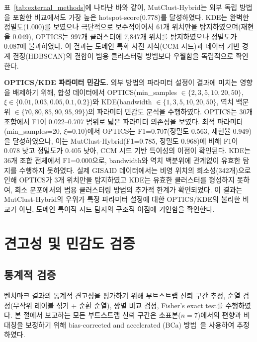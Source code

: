 표~\ref{tab:external_methods}에 나타난 바와 같이, MutClust-Hybrid는 외부 독립 방법을 포함한 비교에서도 가장 높은 hotspot-score(0.778)를 달성하였다.
KDE는 완벽한 정밀도(1.000)를 보였으나 극단적으로 보수적이어서 61개 위치만을 탐지하였으며(재현율 0.049), OPTICS는 997개 클러스터에 7,847개 위치를 탐지하였으나 정밀도가 0.087에 불과하였다.
이 결과는 도메인 특화 사전 지식(CCM 시드)과 데이터 기반 경계 결정(HDBSCAN)의 결합이 범용 클러스터링 방법보다 우월함을 독립적으로 확인한다.

\textbf{OPTICS/KDE 파라미터 민감도.}
외부 방법의 파라미터 설정이 결과에 미치는 영향을 배제하기 위해, 합성 데이터에서 OPTICS(min\_samples $\in \{2, 3, 5, 10, 20, 50\}$, $\xi \in \{0.01, 0.03, 0.05, 0.1, 0.2\}$)와 KDE(bandwidth $\in \{1, 3, 5, 10, 20, 50\}$, 역치 백분위 $\in \{70, 80, 85, 90, 95, 99\}$)의 파라미터 민감도 분석을 수행하였다.
OPTICS는 30개 조합에서 F1이 0.022--0.707 범위로 넓은 파라미터 의존성을 보였다.
최적 파라미터(min\_samples=20, $\xi$=0.10)에서 OPTICS는 F1=0.707(정밀도 0.563, 재현율 0.949)을 달성하였으나, 이는 MutClust-Hybrid(F1=0.785, 정밀도 0.968)에 비해 F1이 0.078 낮고 정밀도가 0.405 낮아, CCM 시드 기반 특이성의 이점이 확인된다.
KDE는 36개 조합 전체에서 F1=0.000으로, bandwidth와 역치 백분위에 관계없이 유효한 탐지를 수행하지 못하였다.
실제 GISAID 데이터에서는 비영 위치의 희소성(342개)으로 인해 OPTICS가 3개 위치만을 탐지하였고 KDE는 유효한 클러스터를 형성하지 못하여, 희소 분포에서의 범용 클러스터링 방법의 추가적 한계가 확인되었다.
이 결과는 MutClust-Hybrid의 우위가 특정 파라미터 설정에 대한 OPTICS/KDE의 불리한 비교가 아닌, 도메인 특이적 시드 탐지의 구조적 이점에 기인함을 확인한다.


\section{견고성 및 민감도 검증}
\label{sec:robustness_validation}

\subsection{통계적 검증}
\label{sec:statistical_validation}


벤치마크 결과의 통계적 견고성을 평가하기 위해 부트스트랩 신뢰 구간 추정, 순열 검정(무작위 레이블 섞기 + 순환 순열), 쌍별 비교 검정, Fisher's exact test를 수행하였다.
본 절에서 보고하는 모든 부트스트랩 신뢰 구간은 소표본($n = 7$)에서의 편향과 비대칭을 보정하기 위해 bias-corrected and accelerated (BCa) 방법~\cite{efron1987better}을 사용하여 추정하였다.

